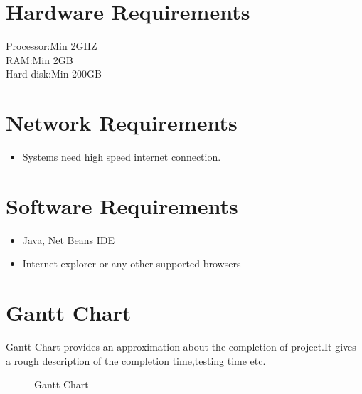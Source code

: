 \documentclass[12pt,a4paper,oneside]{report}
\begin{document}
\section{Hardware Requirements}

  Processor\hspace{.54in}:\hspace{.54in}Min 2GHZ\\

 RAM\hspace{.8in}:\hspace{.54in}Min 2GB\\
 
 Hard disk\hspace{.55in}:\hspace{.54in}Min 200GB\\
 
 
 
 
 \pagebreak
\section{Network Requirements}
\begin{itemize}
\item Systems need high speed internet connection.
\end{itemize}
\section{Software Requirements}
\begin{itemize}
\item Java, Net Beans IDE
\item Internet explorer or any other supported browsers 
\end{itemize}
\pagebreak
\section{Gantt Chart}
Gantt Chart provides an approximation about the completion of project.It gives a rough description of the completion time,testing time etc.
\begin{figure}[h]
\begin{center}
\caption{Gantt Chart}
\end{center}
\end{figure}
\end{document}

